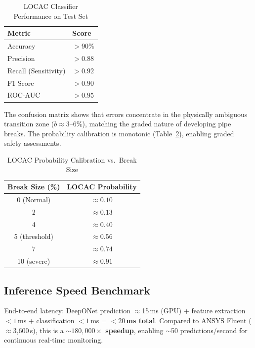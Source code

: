 \documentclass[conference]{IEEEtran}
\begin{document}
\begin{table}[htbp]
\caption{LOCAC Classifier Performance on Test Set}
\label{tab:locac_metrics}
\centering
\begin{tabular}{ll}
\toprule
\textbf{Metric} & \textbf{Score} \\
\midrule
Accuracy & $> 90\%$ \\
Precision & $> 0.88$ \\
Recall (Sensitivity) & $> 0.92$ \\
F1 Score & $> 0.90$ \\
ROC-AUC & $> 0.95$ \\
\bottomrule
\end{tabular}
\end{table}

The confusion matrix shows that errors concentrate in the physically ambiguous transition zone ($b \approx 3$--6\%), matching the graded nature of developing pipe breaks. The probability calibration is monotonic (Table~\ref{tab:probability}), enabling graded safety assessments.

\begin{table}[htbp]
\caption{LOCAC Probability Calibration vs.\ Break Size}
\label{tab:probability}
\centering
\begin{tabular}{cc}
\toprule
\textbf{Break Size (\%)} & \textbf{LOCAC Probability} \\
\midrule
0 (Normal) & $\approx 0.10$ \\
2 & $\approx 0.13$ \\
4 & $\approx 0.40$ \\
5 (threshold) & $\approx 0.56$ \\
7 & $\approx 0.74$ \\
10 (severe) & $\approx 0.91$ \\
\bottomrule
\end{tabular}
\end{table}

\subsection{Inference Speed Benchmark}

End-to-end latency: DeepONet prediction $\approx$15\,ms (GPU) + feature extraction $< 1$\,ms + classification $< 1$\,ms = \textbf{$< 20$\,ms total}. Compared to ANSYS Fluent ($\approx$3,600\,s), this is a \textbf{${\sim}180{,}000\times$ speedup}, enabling $\sim$50 predictions/second for continuous real-time monitoring.

\end{document}
